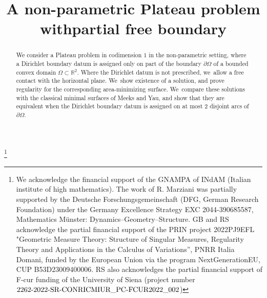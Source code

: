 \documentclass[JEP,XML,SOM,Unicode, NoFloatCountersInSection,published]{cedram}
\theoremstyle{definition}
\begin{document}
\frontmatter
\title{A non-parametric Plateau problem with\nobreakspace partial free boundary}

\author[\initial{G.} \lastname{Bellettini}]{ }
\address{Dipartimento di Ingegneria dell'Informazione e Scienze Matematiche, Università di Siena,\\
53100 Siena, Italy,\\
\& International Centre for Theoretical Physics ICTP, Mathematics Section,\\ 34151 Trieste, Italy}

\author[\initial{R.} \lastname{Marziani}]{ }
\address{Dipartimento di Ingegneria dell'Informazione e Scienze Matematiche, Università di Siena,\\
53100 Siena, Italy}

\author[\initial{R.} \lastname{Scala}]{\nobreakauthor {}}
\address{Dipartimento di Ingegneria dell'Informazione e Scienze Matematiche, Università di Siena,\\
53100 Siena, Italy}

\thanks{We acknowledge the financial support of the GNAMPA of INdAM (Italian institute of high mathematics). The work of R. Marziani was partially supported by the Deutsche Forschungsgemeinschaft (DFG, German Research Foundation) under the Germany Excellence Strategy EXC 2044-390685587, Mathematics Münster: Dynamics--Geometry--Structure. GB and RS acknowledge the partial financial support of the PRIN project 2022PJ9EFL "Geometric Measure Theory: Structure of Singular Measures, Regularity Theory and Applications in the Calculus of Variations'', PNRR Italia Domani, funded by the European Union via the program NextGenerationEU, CUP B53D23009400006. RS also acknowledges the partial financial support of F-cur funding of the University of Siena (project number $\textup{2262-2022-SR-CONRICMIUR\_PC-FCUR2022\_002}$)}

\begin{abstract}
We consider a Plateau problem in codimension $1$ in the non-parametric setting, where a Dirichlet boundary datum is assigned only on part of the boundary $\partial \Omega$ of a bounded convex domain $\Omega\subset\mathbb{R}^2$. Where the Dirichlet datum is not prescribed, we~allow a free contact with the horizontal plane. We~show existence of a solution, and prove regularity for the corresponding area-minimizing surface. We~compare these solutions with the classical minimal surfaces of Meeks and Yau, and show that they are equivalent when the Dirichlet boundary datum is assigned on at most $2$ disjoint arcs of $\partial \Omega$.
\end{abstract}
\end{document}
